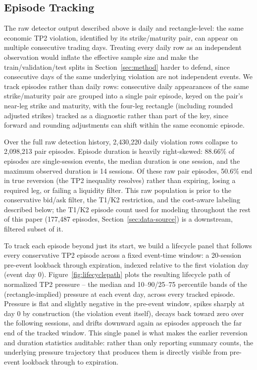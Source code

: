 \documentclass[sigconf,review,anonymous]{acmart}
\begin{document}
\subsection{Episode Tracking}
\label{sec:episode-tracking}
The raw detector output described above is daily and rectangle-level: the same economic TP2 violation, identified by its strike/maturity pair, can appear on multiple consecutive trading days. Treating every daily row as an independent observation would inflate the effective sample size and make the train/validation/test splits in Section~\ref{sec:method} harder to defend, since consecutive days of the same underlying violation are not independent events. We track episodes rather than daily rows: consecutive daily appearances of the same strike/maturity pair are grouped into a single pair episode, keyed on the pair's near-leg strike and maturity, with the four-leg rectangle (including rounded adjusted strikes) tracked as a diagnostic rather than part of the key, since forward and rounding adjustments can shift within the same economic episode.

Over the full raw detection history, 2{,}430{,}220 daily violation rows collapse to 2{,}098{,}213 pair episodes. Episode duration is heavily right-skewed: 88.66\% of episodes are single-session events, the median duration is one session, and the maximum observed duration is 14 sessions. Of these raw pair episodes, 50.6\% end in true reversion (the TP2 inequality resolves) rather than expiring, losing a required leg, or failing a liquidity filter. This raw population is prior to the conservative bid/ask filter, the T1/K2 restriction, and the cost-aware labeling described below; the T1/K2 episode count used for modeling throughout the rest of this paper (177{,}487 episodes, Section~\ref{sec:data-source}) is a downstream, filtered subset of it.

To track each episode beyond just its start, we build a lifecycle panel that follows every conservative TP2 episode across a fixed event-time window: a 20-session pre-event lookback through expiration, indexed relative to the first violation day (event day 0). Figure~\ref{fig:lifecyclepath} plots the resulting lifecycle path of normalized TP2 pressure -- the median and 10--90/25--75 percentile bands of the (rectangle-implied) pressure at each event day, across every tracked episode. Pressure is flat and slightly negative in the pre-event window, spikes sharply at day 0 by construction (the violation event itself), decays back toward zero over the following sessions, and drifts downward again as episodes approach the far end of the tracked window. This single panel is what makes the earlier reversion and duration statistics auditable: rather than only reporting summary counts, the underlying pressure trajectory that produces them is directly visible from pre-event lookback through to expiration.
\end{document}
